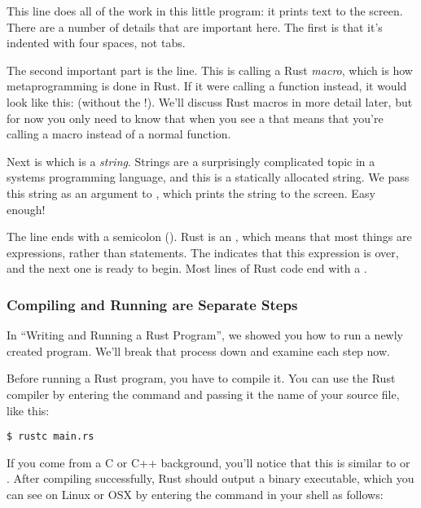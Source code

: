 This line does all of the work in this little program: it prints text to the screen. There are a number of details that are important 
here. The first is that it’s indented with four spaces, not tabs.

\blank

The second important part is the  line. This is calling a Rust \emph{macro}, which is how metaprogramming is done 
in Rust. If it were calling a function instead, it would look like this:  (without the !). We'll discuss Rust macros 
in more detail later, but for now you only need to know that when you see a \code{!} that means that you’re calling a macro 
instead of a normal function.

\blank

Next is  which is a \emph{string}. Strings are a surprisingly complicated topic in a systems programming 
language, and this is a statically allocated string. We pass this string as an argument to , which prints the 
string to the screen. Easy enough!

\blank

The line ends with a semicolon (\code{;}). Rust is an , which means that most things are 
expressions, rather than statements. The \code{;} indicates that this expression is over, and the next one is ready 
to begin. Most lines of Rust code end with a \code{;}.

\subsubsection*{Compiling and Running are Separate Steps}

In \enquote{Writing and Running a Rust Program}, we showed you how to run a newly created program. We'll break that process 
down and examine each step now.

\blank

Before running a Rust program, you have to compile it. You can use the Rust compiler by entering the 
 command and passing it the name of your source file, like this:

\begin{verbatim}
$ rustc main.rs
\end{verbatim}

If you come from a C or C++ background, you'll notice that this is similar to  or . After 
compiling successfully, Rust should output a binary executable, which you can see on Linux or OSX by entering the 
 command in your shell as follows:

